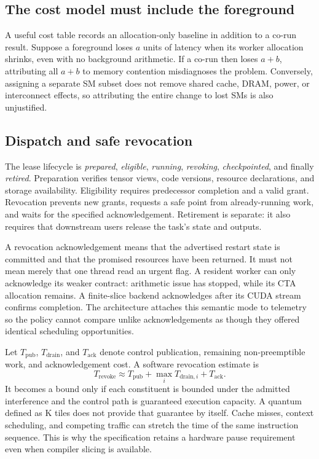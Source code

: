 \subsection{The cost model must include the foreground}
A useful cost table records an allocation-only baseline in addition to a
co-run result. Suppose a foreground loses $a$ units of latency when its
worker allocation shrinks, even with no background arithmetic. If a co-run
then loses $a+b$, attributing all $a+b$ to memory contention misdiagnoses the
problem. Conversely, assigning a separate SM subset does not remove shared
cache, DRAM, power, or interconnect effects, so attributing the entire change
to lost SMs is also unjustified.

\subsection{Dispatch and safe revocation}
The lease lifecycle is \emph{prepared}, \emph{eligible}, \emph{running},
\emph{revoking}, \emph{checkpointed}, and finally \emph{retired}. Preparation
verifies tensor views, code versions, resource declarations, and storage
availability. Eligibility requires predecessor completion and a valid grant.
Revocation prevents new grants, requests a safe point from already-running
work, and waits for the specified acknowledgement. Retirement is separate:
it also requires that downstream users release the task's state and outputs.

A revocation acknowledgement means that the advertised restart state is
committed and that the promised resources have been returned. It must not
mean merely that one thread read an urgent flag. A resident worker can only
acknowledge its weaker contract: arithmetic issue has stopped, while its
CTA allocation remains. A finite-slice backend acknowledges after its CUDA
stream confirms completion. The architecture attaches this semantic mode
to telemetry so the policy cannot compare unlike acknowledgements as though
they offered identical scheduling opportunities.

Let $T_{\mathrm{pub}}$, $T_{\mathrm{drain}}$, and $T_{\mathrm{ack}}$ denote
control publication, remaining non-preemptible work, and acknowledgement
cost. A software revocation estimate is
\begin{equation}
 T_{\mathrm{revoke}}\approx
 T_{\mathrm{pub}}+\max_i T_{\mathrm{drain},i}+T_{\mathrm{ack}}.
\end{equation}
It becomes a bound only if each constituent is bounded under the admitted
interference and the control path is guaranteed execution capacity. A quantum
defined as K tiles does not provide that guarantee by itself. Cache misses,
context scheduling, and competing traffic can stretch the time of the same
instruction sequence. This is why the specification retains a hardware
pause requirement even when compiler slicing is available.


